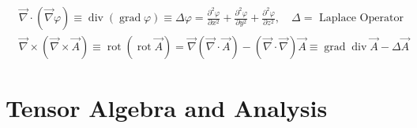 \begin{equation}
\begin{aligned}
&\vec{\nabla} \cdot(\vec{\nabla} \varphi) \equiv \operatorname{div}(\operatorname{grad} \varphi) \equiv \Delta \varphi=\frac{\partial^{2} \varphi}{\partial x^{2}}+\frac{\partial^{2} \varphi}{\partial y^{2}}+\frac{\partial^{2} \varphi}{\partial z^{2}}, \quad \Delta=\text { Laplace Operator }\\
&\vec{\nabla} \times(\vec{\nabla} \times \vec{A}) \equiv \operatorname{rot}(\operatorname{rot} \vec{A})=\vec{\nabla}(\vec{\nabla} \cdot \vec{A})-(\vec{\nabla} \cdot \vec{\nabla}) \vec{A} \equiv \operatorname{grad} \operatorname{div} \vec{A}-\Delta \vec{A}
\end{aligned}
\end{equation}

\section{Tensor Algebra and Analysis}
